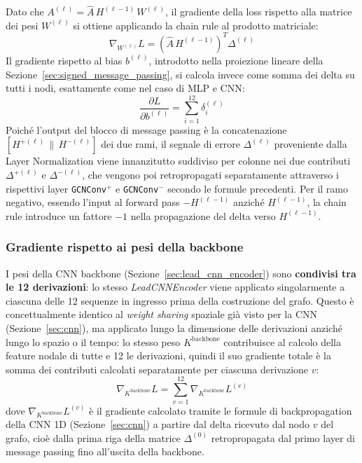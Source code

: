 Dato che $A^{(\ell)}=\hat{A}\,H^{(\ell-1)}\,W^{(\ell)}$, il gradiente della loss rispetto alla matrice dei pesi $W^{(\ell)}$ si ottiene applicando la chain rule al prodotto matriciale:
\[
\nabla_{W^{(\ell)}}L = \left(\hat{A}\,H^{(\ell-1)}\right)^{T}\Delta^{(\ell)}
\]
Il gradiente rispetto al bias $b^{(\ell)}$, introdotto nella proiezione lineare della Sezione~\ref{sec:signed_message_passing}, si calcola invece come somma dei delta su tutti i nodi, esattamente come nel caso di MLP e CNN:
\[
\frac{\partial L}{\partial b^{(\ell)}} = \sum_{i=1}^{12}\delta_i^{(\ell)}
\]
Poiché l'output del blocco di message passing è la concatenazione $[H^{+(\ell)}\,\|\,H^{-(\ell)}]$ dei due rami, il segnale di errore $\Delta^{(\ell)}$ proveniente dalla Layer Normalization viene innanzitutto suddiviso per colonne nei due contributi $\Delta^{+(\ell)}$ e $\Delta^{-(\ell)}$, che vengono poi retropropagati separatamente attraverso i rispettivi layer \texttt{GCNConv}$^+$ e \texttt{GCNConv}$^-$ secondo le formule precedenti. Per il ramo negativo, essendo l'input al forward pass $-H^{(\ell-1)}$ anziché $H^{(\ell-1)}$, la chain rule introduce un fattore $-1$ nella propagazione del delta verso $H^{(\ell-1)}$.

\subsubsection{Gradiente rispetto ai pesi della backbone}

I pesi della CNN backbone (Sezione~\ref{sec:lead_cnn_encoder}) sono \textbf{condivisi tra le 12 derivazioni}: lo stesso \textit{LeadCNNEncoder} viene applicato singolarmente a ciascuna delle 12 sequenze in ingresso prima della costruzione del grafo. Questo è concettualmente identico al \textit{weight sharing} spaziale già visto per la CNN (Sezione~\ref{sec:cnn}), ma applicato lungo la dimensione delle derivazioni anziché lungo lo spazio o il tempo: lo stesso peso $K^{\text{backbone}}$ contribuisce al calcolo della feature nodale di tutte e 12 le derivazioni, quindi il suo gradiente totale è la somma dei contributi calcolati separatamente per ciascuna derivazione $v$:
\[
\nabla_{K^{\text{backbone}}}L=\sum_{v=1}^{12}\nabla_{K^{\text{backbone}}}L^{(v)}
\]
dove $\nabla_{K^{\text{backbone}}}L^{(v)}$ è il gradiente calcolato tramite le formule di backpropagation della CNN 1D (Sezione~\ref{sec:cnn}) a partire dal delta ricevuto dal nodo $v$ del grafo, cioè dalla prima riga della matrice $\Delta^{(0)}$ retropropagata dal primo layer di message passing fino all'uscita della backbone.

